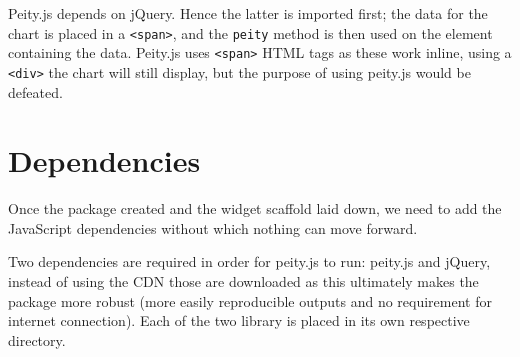 \documentclass[
  10pt,
]{krantz}
\makeatletter
\newenvironment{Shaded}{\begin{snugshade}}{\end{snugshade}}
\newcommand{\AttributeTok}[1]{\textcolor[rgb]{0.61,0.61,0.61}{#1}}
\newcommand{\CommentTok}[1]{\textcolor[rgb]{0.37,0.37,0.37}{\textit{#1}}}
\newcommand{\DataTypeTok}[1]{\textcolor[rgb]{0.27,0.27,0.27}{#1}}
\newcommand{\KeywordTok}[1]{\textcolor[rgb]{0.27,0.27,0.27}{\textbf{#1}}}
\newcommand{\NormalTok}[1]{#1}
\newcommand{\OperatorTok}[1]{\textcolor[rgb]{0.43,0.43,0.43}{\textbf{#1}}}
\newcommand{\OtherTok}[1]{\textcolor[rgb]{0.37,0.37,0.37}{#1}}
\newcommand{\StringTok}[1]{\textcolor[rgb]{0.5,0.5,0.5}{#1}}
\newenvironment{kframe}{%
\medskip{}
\setlength{\fboxsep}{.8em}
 \def\at@end@of@kframe{}%
 \ifinner\ifhmode%
  \def\at@end@of@kframe{\end{minipage}}%
  \begin{minipage}{\columnwidth}%
 \fi\fi%
 \def\FrameCommand##1{\hskip\@totalleftmargin \hskip-\fboxsep
 \colorbox{shadecolor}{##1}\hskip-\fboxsep
     \hskip-\linewidth \hskip-\@totalleftmargin \hskip\columnwidth}%
 \MakeFramed {\advance\hsize-\width
   \@totalleftmargin\z@ \linewidth\hsize
   \@setminipage}}%
 {\par\unskip\endMakeFramed%
 \at@end@of@kframe}
\renewenvironment{Shaded}{\begin{kframe}}{\end{kframe}}
\makeatother
\begin{document}
\begin{Shaded}
\end{Shaded}

Peity.js depends on jQuery. Hence the latter is imported first; the data for the chart is placed in a \texttt{\textless{}span\textgreater{}}, and the \texttt{peity} method is then used on the element containing the data. Peity.js uses \texttt{\textless{}span\textgreater{}} HTML tags as these work inline, using a \texttt{\textless{}div\textgreater{}} the chart will still display, but the purpose of using peity.js would be defeated.

\hypertarget{widgets-realistic-deps}{%
\section{Dependencies}\label{widgets-realistic-deps}}

Once the package created and the widget scaffold laid down, we need to add the JavaScript dependencies without which nothing can move forward.

Two dependencies are required in order for peity.js to run: peity.js and jQuery, instead of using the CDN those are downloaded as this ultimately makes the package more robust (more easily reproducible outputs and no requirement for internet connection). Each of the two library is placed in its own respective directory.
\end{document}
